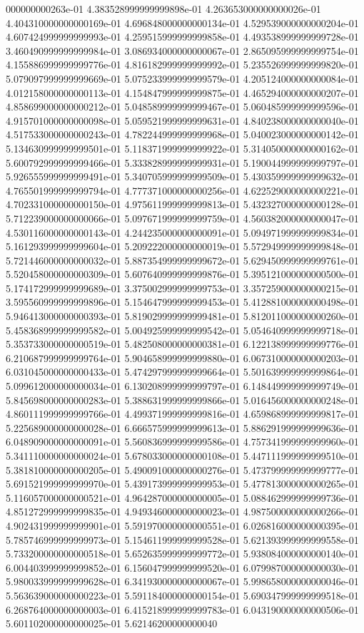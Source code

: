 000000000263e-01	4.383528999999999898e-01	4.263653000000000026e-01	4.404310000000000169e-01	4.696848000000000134e-01	4.529539000000000204e-01	4.607424999999999993e-01	4.259515999999999858e-01	4.493538999999999728e-01	3.460490999999999984e-01	3.086934000000000067e-01	2.865095999999999754e-01	4.155886999999999776e-01	4.816182999999999992e-01	5.235526999999999820e-01	5.079097999999999669e-01	5.075233999999999579e-01	4.205124000000000084e-01	4.012158000000000113e-01	4.154847999999999875e-01	4.465294000000000207e-01	4.858699000000000212e-01	5.048589999999999467e-01	5.060485999999999596e-01	4.915701000000000098e-01	5.059521999999999631e-01	4.840238000000000040e-01	4.517533000000000243e-01	4.782244999999999968e-01	5.040023000000000142e-01	5.134630999999999501e-01	5.118371999999999922e-01	5.314050000000000162e-01	5.600792999999999466e-01	5.333828999999999931e-01	5.190044999999999797e-01	5.926555999999999491e-01	5.340705999999999509e-01	5.430359999999999632e-01	4.765501999999999794e-01	4.777371000000000256e-01	4.622529000000000221e-01	4.702331000000000150e-01	4.975611999999999813e-01	5.432327000000000128e-01	5.712239000000000066e-01	5.097671999999999759e-01	4.560382000000000047e-01	4.530116000000000143e-01	4.244235000000000091e-01	5.094971999999999834e-01	5.161293999999999604e-01	5.209222000000000019e-01	5.572949999999999848e-01	5.721446000000000032e-01	5.887354999999999672e-01	5.629450999999999761e-01	5.520458000000000309e-01	5.607640999999999876e-01	5.395121000000000500e-01	5.174172999999999689e-01	3.375002999999999753e-01	3.357259000000000215e-01	3.595560999999999896e-01	5.154647999999999453e-01	5.412881000000000498e-01	5.946413000000000393e-01	5.819029999999999481e-01	5.812011000000000260e-01	5.458368999999999582e-01	5.004925999999999542e-01	5.054640999999999718e-01	5.353733000000000519e-01	5.482508000000000381e-01	6.122138999999999776e-01	6.210687999999999764e-01	5.904658999999999880e-01	6.067310000000000203e-01	6.031045000000000433e-01	5.474297999999999664e-01	5.501639999999999864e-01	5.099612000000000034e-01	6.130208999999999797e-01	6.148449999999999749e-01	5.845698000000000283e-01	5.388631999999999866e-01	5.016456000000000248e-01	4.860111999999999766e-01	4.499371999999999816e-01	4.659868999999999817e-01	5.225689000000000028e-01	6.666575999999999613e-01	5.886291999999999636e-01	6.048909000000000091e-01	5.560836999999999586e-01	4.757341999999999960e-01	5.341110000000000024e-01	5.678033000000000108e-01	5.447111999999999510e-01	5.381810000000000205e-01	5.490091000000000276e-01	5.473799999999999777e-01	5.691521999999999970e-01	5.439173999999999953e-01	5.477813000000000265e-01	5.116057000000000521e-01	4.964287000000000005e-01	5.088462999999999736e-01	4.851272999999999835e-01	4.949346000000000023e-01	4.987500000000000266e-01	4.902431999999999901e-01	5.591970000000000551e-01	6.026816000000000395e-01	5.785746999999999973e-01	5.154611999999999528e-01	5.621393999999999558e-01	5.733200000000000518e-01	5.652635999999999772e-01	5.938084000000000140e-01	6.004403999999999852e-01	6.156047999999999520e-01	6.079987000000000030e-01	5.980033999999999628e-01	6.341930000000000067e-01	5.998658000000000046e-01	5.563639000000000223e-01	5.591184000000000154e-01	5.690347999999999518e-01	6.268764000000000003e-01	6.415218999999999783e-01	6.043190000000000506e-01	5.601102000000000025e-01	5.62146200000000040